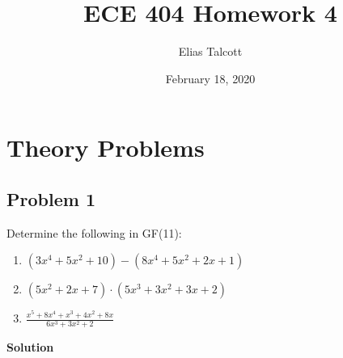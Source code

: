 \documentclass[11pt]{article}
\def \myTitle {ECE 404 Homework 4}
\def \myName {Elias Talcott}
\def \myDate {February 18, 2020}
\begin{document}
\begin{titlepage}
\title{\myTitle}
\author{\myName}
\date{\myDate}
\maketitle
\vspace{1in}
\tableofcontents
\thispagestyle{empty}
\end{titlepage}

\section{Theory Problems}

\subsection{Problem 1}
Determine the following in GF(11):

\begin{enumerate}[label=(\alph*)]
\item $(3x^4 + 5x^2 + 10) - (8x^4 + 5x^2 + 2x + 1)$
\item $(5x^2 + 2x + 7) \cdot (5x^3 + 3x^2 + 3x + 2)$
\item $\displaystyle{\frac{x^5 + 8x^4 + x^3 + 4x^2 + 8x}{6x^3 + 3x^2 + 2}}$
\end{enumerate}

\textbf{Solution}
\end{document}
